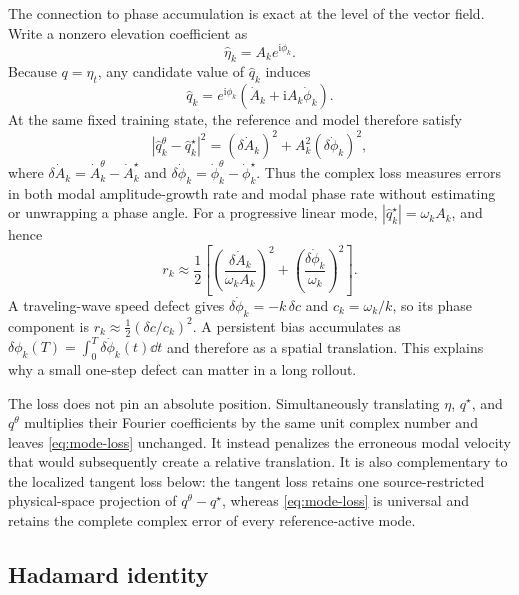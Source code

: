 The connection to phase accumulation is exact at the level of the vector
field.  Write a nonzero elevation coefficient as
\begin{equation}
  \widehat\eta_k=A_k e^{\mathrm i\phi_k}.
\end{equation}
Because $q=\eta_t$, any candidate value of $\widehat q_k$ induces
\begin{equation}
  \widehat q_k=e^{\mathrm i\phi_k}
  \left(\dot A_k+\mathrm i A_k\dot\phi_k\right).
\end{equation}
At the same fixed training state, the reference and model therefore satisfy
\begin{equation}
  |\widehat q_k^\theta-\widehat q_k^\star|^2
  =(\delta\dot A_k)^2+A_k^2(\delta\dot\phi_k)^2,
  \label{eq:mode-rate-decomposition}
\end{equation}
where
$\delta\dot A_k=\dot A_k^\theta-\dot A_k^\star$ and
$\delta\dot\phi_k=\dot\phi_k^\theta-\dot\phi_k^\star$.
Thus the complex loss measures errors in both modal amplitude-growth rate and
modal phase rate without estimating or unwrapping a phase angle.  For a
progressive linear mode, $|\widehat q_k^\star|=\omega_k A_k$, and hence
\begin{equation}
  r_k\approx\frac12\left[
  \left(\frac{\delta\dot A_k}{\omega_k A_k}\right)^2
  +\left(\frac{\delta\dot\phi_k}{\omega_k}\right)^2
  \right].
  \label{eq:mode-linear-rate-error}
\end{equation}
A traveling-wave speed defect gives
$\delta\dot\phi_k=-k\,\delta c$ and $c_k=\omega_k/k$, so its phase component is
$r_k\approx\tfrac12(\delta c/c_k)^2$.  A persistent bias accumulates as
$\delta\phi_k(T)=\int_0^T\delta\dot\phi_k(t)\dd t$ and therefore as a spatial
translation.  This explains why a small one-step defect can matter in a long
rollout.

The loss does not pin an absolute position.  Simultaneously translating
$\eta$, $q^\star$, and $q^\theta$ multiplies their Fourier coefficients by the
same unit complex number and leaves \eqref{eq:mode-loss} unchanged.  It instead
penalizes the erroneous modal velocity that would subsequently create a
relative translation.  It is also complementary to the localized tangent
loss below: the tangent loss retains one source-restricted physical-space
projection of $q^\theta-q^\star$, whereas \eqref{eq:mode-loss} is universal and
retains the complete complex error of every reference-active mode.

\subsection{Hadamard identity}

